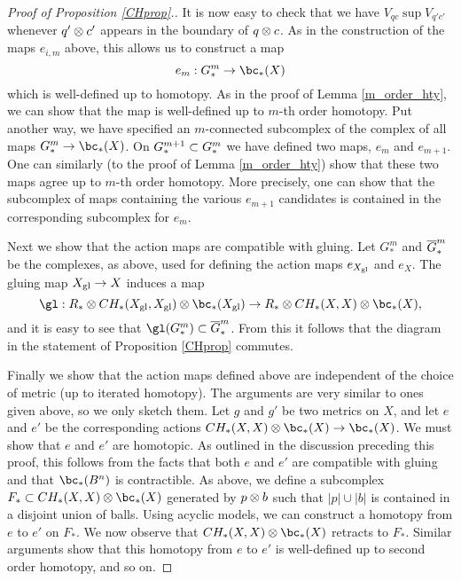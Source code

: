 \begin{proof}[Proof of Proposition \ref{CHprop}.]
It is now easy to check that we have $V_{qc} \sup V_{q'c'}$
whenever $q'\otimes c'$ appears in the boundary of $q\otimes c$.
As in the construction of the maps $e_{i,m}$ above,
this allows us to construct a map
\[
	e_m : G^m_* \to \bc_*(X) 
\]
which is well-defined up to homotopy.
As in the proof of Lemma \ref{m_order_hty}, we can show that the map is well-defined up
to $m$-th order homotopy.
Put another way, we have specified an $m$-connected subcomplex of the complex of
all maps $G^m_* \to \bc_*(X)$.
On $G^{m+1}_* \subset G^m_*$ we have defined two maps, $e_m$ and $e_{m+1}$.
One can similarly (to the proof of Lemma \ref{m_order_hty}) show that 
these two maps agree up to $m$-th order homotopy.
More precisely, one can show that the subcomplex of maps containing the various
$e_{m+1}$ candidates is contained in the corresponding subcomplex for $e_m$.

\medskip

Next we show that the action maps are compatible with gluing.
Let $G^m_*$ and $\overline{G}^m_*$ be the complexes, as above, used for defining
the action maps $e_{X_\mathrm{gl}}$ and $e_X$.
The gluing map $X_\mathrm{gl}\to X$ induces a map
\[
	\gl: R_*\ot CH_*(X\sgl, X \sgl) \otimes \bc_*(X \sgl) \to R_*\ot CH_*(X, X) \otimes \bc_*(X) ,
\]
and it is easy to see that $\gl(G^m_*)\sub \ol{G}^m_*$.
From this it follows that the diagram in the statement of Proposition \ref{CHprop} commutes.

\medskip

Finally we show that the action maps defined above are independent of
the choice of metric (up to iterated homotopy).
The arguments are very similar to ones given above, so we only sketch them.
Let $g$ and $g'$ be two metrics on $X$, and let $e$ and $e'$ be the corresponding
actions $CH_*(X, X) \ot \bc_*(X)\to\bc_*(X)$.
We must show that $e$ and $e'$ are homotopic.
As outlined in the discussion preceding this proof,
this follows from the facts that both $e$ and $e'$ are compatible
with gluing and that $\bc_*(B^n)$ is contractible.
As above, we define a subcomplex $F_*\sub  CH_*(X, X) \ot \bc_*(X)$ generated
by $p\otimes b$ such that $|p|\cup|b|$ is contained in a disjoint union of balls.
Using acyclic models, we can construct a homotopy from $e$ to $e'$ on $F_*$.
We now observe that $CH_*(X, X) \ot \bc_*(X)$ retracts to $F_*$.
Similar arguments show that this homotopy from $e$ to $e'$ is well-defined
up to second order homotopy, and so on.
\end{proof}



